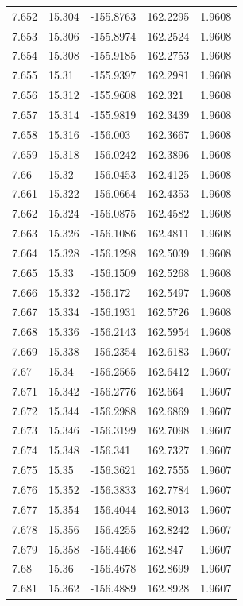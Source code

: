\begin{tabular}{lllll}
7.652 & 15.304 & -155.8763 & 162.2295 & 1.9608 \\
7.653 & 15.306 & -155.8974 & 162.2524 & 1.9608 \\
7.654 & 15.308 & -155.9185 & 162.2753 & 1.9608 \\
7.655 & 15.31 & -155.9397 & 162.2981 & 1.9608 \\
7.656 & 15.312 & -155.9608 & 162.321 & 1.9608 \\
7.657 & 15.314 & -155.9819 & 162.3439 & 1.9608 \\
7.658 & 15.316 & -156.003 & 162.3667 & 1.9608 \\
7.659 & 15.318 & -156.0242 & 162.3896 & 1.9608 \\
7.66 & 15.32 & -156.0453 & 162.4125 & 1.9608 \\
7.661 & 15.322 & -156.0664 & 162.4353 & 1.9608 \\
7.662 & 15.324 & -156.0875 & 162.4582 & 1.9608 \\
7.663 & 15.326 & -156.1086 & 162.4811 & 1.9608 \\
7.664 & 15.328 & -156.1298 & 162.5039 & 1.9608 \\
7.665 & 15.33 & -156.1509 & 162.5268 & 1.9608 \\
7.666 & 15.332 & -156.172 & 162.5497 & 1.9608 \\
7.667 & 15.334 & -156.1931 & 162.5726 & 1.9608 \\
7.668 & 15.336 & -156.2143 & 162.5954 & 1.9608 \\
7.669 & 15.338 & -156.2354 & 162.6183 & 1.9607 \\
7.67 & 15.34 & -156.2565 & 162.6412 & 1.9607 \\
7.671 & 15.342 & -156.2776 & 162.664 & 1.9607 \\
7.672 & 15.344 & -156.2988 & 162.6869 & 1.9607 \\
7.673 & 15.346 & -156.3199 & 162.7098 & 1.9607 \\
7.674 & 15.348 & -156.341 & 162.7327 & 1.9607 \\
7.675 & 15.35 & -156.3621 & 162.7555 & 1.9607 \\
7.676 & 15.352 & -156.3833 & 162.7784 & 1.9607 \\
7.677 & 15.354 & -156.4044 & 162.8013 & 1.9607 \\
7.678 & 15.356 & -156.4255 & 162.8242 & 1.9607 \\
7.679 & 15.358 & -156.4466 & 162.847 & 1.9607 \\
7.68 & 15.36 & -156.4678 & 162.8699 & 1.9607 \\
7.681 & 15.362 & -156.4889 & 162.8928 & 1.9607 \\

\end{tabular}
